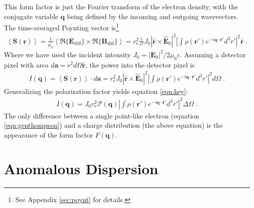 \documentclass[12pt]{article}
\renewcommand{\vec}[1]{\boldsymbol{#1}}
\newcommand{\hvec}[1]{\hat{\vec{#1}}}
\newcommand{\avg}[1]{\left\langle #1 \right\rangle}
\newcommand{\abs}[1]{\left| #1 \right|}
\begin{document}
This form factor is just the Fourier transform of the electron density, with the conjugate variable $\vec{q}$ being defined by the incoming and outgoing wavevectors.  The time-averaged Poynting vector is\footnote{See Appendix \ref{sec:poynt} for details.}
\begin{align}
\avg{\vec{S}(\vec{r})} = \frac{1}{\mu_0}\avg{
\Re\{\vec{E}_\text{diff}\}\times\Re\{\vec{B}_\text{diff}\}} = r_e^2 
\frac{1}{r^2} J_0 | \hvec{r} \times  \hvec{E}_0 |^2 \left| \int \rho(\vec{r}') 
e^{-i\vec{q}\cdot\vec{r}'} d^3r' \right|^2 \hvec{r} \;.
\end{align}
Where we have used the incident intensity $J_0 = |\vec{E}_0|^2/2\mu_0c$.  
Assuming a detector pixel with area $d\vec{a} = r^2 d\Omega \hvec{r}$, the power 
into the detector pixel is
\begin{align}
I(\vec{q}) = \avg{\vec{S}(\vec{r})} \cdot d\vec{a} = r_e^2 J_0 | \hvec{r} \times 
 \hvec{E}_0 |^2 \left| \int \rho(\vec{r}') e^{-i\vec{q}\cdot\vec{r}'} d^3r' 
\right|^2 d\Omega\;.
\end{align}
Generalizing the polarization factor yields equation \ref{eqn:key}:
\begin{align}\label{eqn:keyF}
    I(\vec{q}) = J_0 r_e^2  \mathcal{P}(\vec{q})  
\abs{\int \rho(\vec{r}') e^{-i\vec{q}\cdot\vec{r}'} d^3r'}^2 \Delta \Omega \;.
\end{align}
The only difference between a single point-like electron (equation  
\ref{eqn:genthompson}) and a charge distribution (the above equation) is the 
appearance of the form factor $F(\vec{q})$.   


\section{Anomalous Dispersion}
\end{document}
